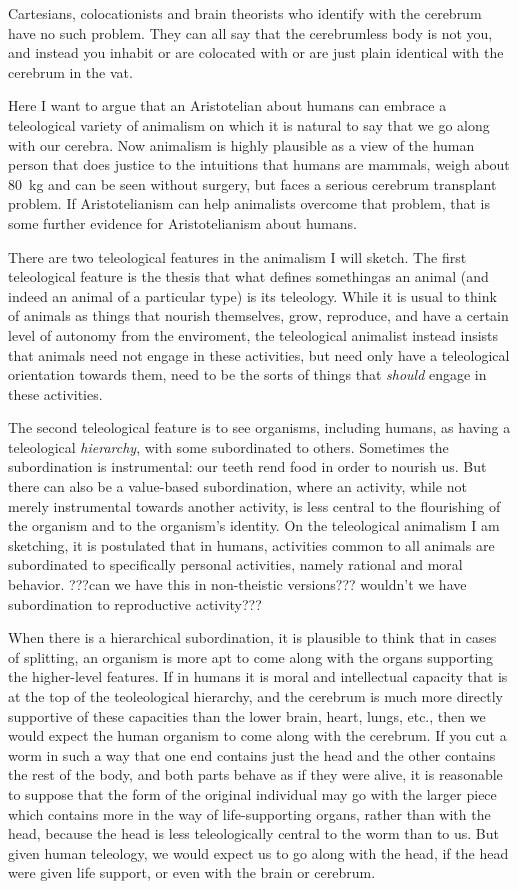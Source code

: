 Cartesians, colocationists and brain theorists who identify with the cerebrum have no such problem. They can all say that
the cerebrumless body is not you, and instead you inhabit or are colocated with or are just plain identical with the cerebrum
in the vat. 

Here I want to argue that an Aristotelian about humans can embrace a teleological variety of animalism on which it is natural to say that 
we go along with our cerebra. Now animalism is highly plausible as 
a view of the human person that does justice to the intuitions that humans are mammals, weigh about 80~kg and can be seen 
without surgery, but faces a serious cerebrum transplant problem. If Aristotelianism can help animalists overcome that problem,
that is some further evidence for Aristotelianism about humans.

There are two teleological features in the animalism I will sketch. The first teleological feature is the thesis 
that what defines somethingas an animal (and indeed an animal of a particular type) is its teleology. While it is usual to 
think of animals as things that nourish themselves, grow, reproduce, and have a certain level of autonomy from the enviroment, 
the teleological animalist instead insists that animals need not engage in these activities, but need only have a teleological
orientation towards them, need to be the sorts of things that \textit{should} engage in these activities. 

The second teleological feature is to see organisms, including humans, as having a teleological \textit{hierarchy}, with some
\tele{} subordinated to others. Sometimes the subordination is instrumental: our teeth rend food in order to nourish us. 
But there can also be a value-based subordination, where an activity, while not merely instrumental towards another activity, 
is less central to the flourishing of the organism and to the organism's identity. On the teleological animalism I am sketching,
it is postulated that in humans, activities common to all animals are subordinated to specifically personal activities, namely 
rational and moral behavior. ???can we have this in non-theistic versions??? wouldn't we have subordination to reproductive
activity???

When there is a hierarchical subordination, it is plausible to think that in cases of splitting, an organism is more apt
to come along with the organs supporting the higher-level features. If in humans it is moral and intellectual capacity 
that is at the top of the teoleological hierarchy, and the cerebrum is much more directly supportive of these capacities
than the lower brain, heart, lungs, etc., then we would expect the human organism to come along with the cerebrum. If you
cut a worm in such a way that one end contains just the head and the other contains the rest of the body, and both parts
behave as if they were alive, it is reasonable to suppose that the form of the original individual may go with the larger
piece which contains more in the way of life-supporting organs, rather than with the head, because the head is less 
teleologically central to the worm than to us. But given human teleology, we would expect us to go along with the head,
if the head were given life support, or even with the brain or cerebrum.

